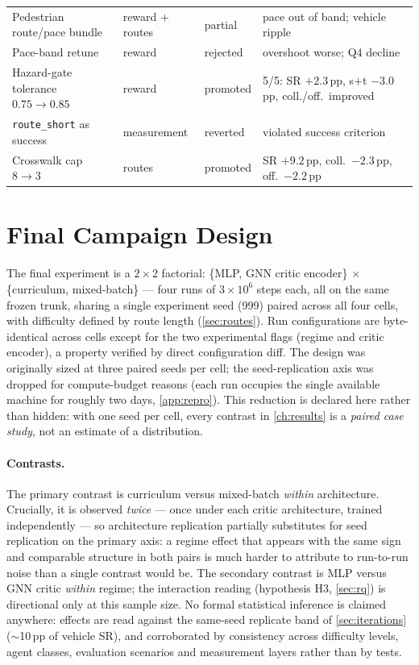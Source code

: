 \begin{table}[t]
\begin{tabular}{@{}p{4.2cm}p{2.6cm}p{2.2cm}p{3.6cm}@{}}
    Pedestrian route/pace bundle & reward $+$ routes & partial & pace out of band; vehicle ripple \\
    Pace-band retune & reward & rejected & overshoot worse; Q4 decline \\
    Hazard-gate tolerance $0.75 \to 0.85$ & reward & promoted & 5/5: SR $+2.3$\,pp, s$+$t $-3.0$\,pp, coll./off.\ improved \\
    \texttt{route\_short} as success & measurement & reverted & violated success criterion \\
    Crosswalk cap $8 \to 3$ & routes & promoted & SR $+9.2$\,pp, coll.\ $-2.3$\,pp, off.\ $-2.2$\,pp \\
    \bottomrule
  \end{tabular}
\end{table}

\section{Final Campaign Design}
\label{sec:campaign}

The final experiment is a $2 \times 2$ factorial:
\{MLP, GNN critic encoder\} $\times$ \{curriculum, mixed-batch\} --- four
runs of $3\times10^{6}$ steps each, all on the same frozen trunk, sharing
a single experiment seed (999) paired across all four cells, with
difficulty defined by route length (\cref{sec:routes}). Run
configurations are byte-identical across cells except for the two
experimental flags (regime and critic encoder), a property verified by
direct configuration diff. The design was originally sized at three
paired seeds per cell; the seed-replication axis was dropped for
compute-budget reasons (each run occupies the single available machine
for roughly two days, \cref{app:repro}). This reduction is declared here
rather than hidden: with one seed per cell, every contrast in
\cref{ch:results} is a \emph{paired case study}, not an estimate of a
distribution.

\paragraph{Contrasts.}
The primary contrast is curriculum versus mixed-batch \emph{within}
architecture. Crucially, it is observed \emph{twice} --- once under each
critic architecture, trained independently --- so architecture
replication partially substitutes for seed replication on the primary
axis: a regime effect that appears with the same sign and comparable
structure in both pairs is much harder to attribute to run-to-run noise
than a single contrast would be. The secondary contrast is MLP versus GNN
critic \emph{within} regime; the interaction reading (hypothesis H3,
\cref{sec:rq}) is directional only at this sample size. No formal
statistical inference is claimed anywhere: effects are read against the
same-seed replicate band of \cref{sec:iterations} ($\sim$10\,pp of
vehicle SR), and corroborated by consistency across difficulty levels,
agent classes, evaluation scenarios and measurement layers rather than by
tests.

